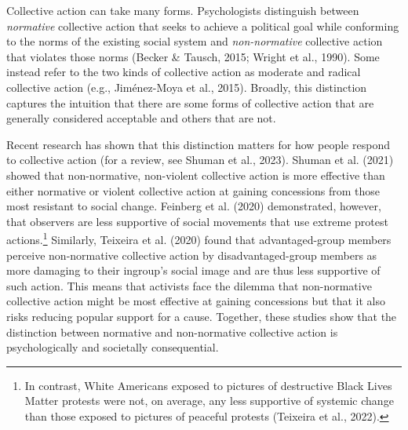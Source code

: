 \documentclass[12pt, letterpaper]{article}
\begin{document}
Collective action can take many forms. Psychologists distinguish between
\emph{normative} collective action that seeks to achieve a political
goal while conforming to the norms of the existing social system and
\emph{non-normative} collective action that violates those norms (Becker
\& Tausch, 2015; Wright et al., 1990). Some instead refer to the two
kinds of collective action as moderate and radical collective action
(e.g., Jiménez-Moya et al., 2015). Broadly, this distinction captures
the intuition that there are some forms of collective action that are
generally considered acceptable and others that are not.

Recent research has shown that this distinction matters for how people
respond to collective action (for a review, see Shuman et al., 2023).
Shuman et al. (2021) showed that non-normative, non-violent collective
action is more effective than either normative or violent collective
action at gaining concessions from those most resistant to social
change. Feinberg et al. (2020) demonstrated, however, that observers are
less supportive of social movements that use extreme protest
actions.\footnote{In contrast, White Americans exposed to pictures of
  destructive Black Lives Matter protests were not, on average, any less
  supportive of systemic change than those exposed to pictures of
  peaceful protests (Teixeira et al., 2022).} Similarly, Teixeira et al.
(2020) found that advantaged-group members perceive non-normative
collective action by disadvantaged-group members as more damaging to
their ingroup's social image and are thus less supportive of such
action. This means that activists face the dilemma that non-normative
collective action might be most effective at gaining concessions but
that it also risks reducing popular support for a cause. Together, these
studies show that the distinction between normative and non-normative
collective action is psychologically and societally consequential.
\end{document}
